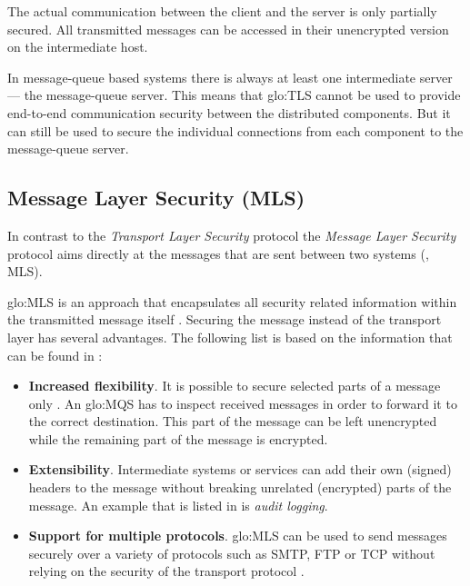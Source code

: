 The  actual  communication between  the  client  and  the server  is  only
partially  secured. All  transmitted  messages can  be  accessed in  their
unencrypted version on the intermediate host.

In message-queue based  systems there is always at  least one intermediate
server --- the message-queue server.  This means that \gls{glo:TLS} cannot
be  used   to  provide  end-to-end  communication   security  between  the
distributed components.  But it can still be used to secure the individual
connections from each component to the message-queue server.

\subsection[Message Layer Security]{Message Layer Security (MLS)}
\label{sec:fundamentals:mls}

In  contrast   to  the   \emph{Transport  Layer  Security}   protocol  the
\emph{Message Layer Security} protocol  aims directly at the messages that
are sent between two systems (\cite{oasis-wss, mls}, MLS).

\gls{glo:MLS}  is  an  approach  that encapsulates  all  security  related
information within the transmitted message itself \cite{mls}. Securing the
message  instead  of the  transport  layer  has  several advantages.   The
following  list  is  based  on  the  information  that  can  be  found  in
\cite{mls}:

\begin{itemize}
\item \textbf{Increased  flexibility}. It  is possible to  secure selected
  parts of  a message  only \cite{mls}.  An  \gls{glo:MQS} has  to inspect
  received   messages   in   order   to   forward  it   to   the   correct
  destination. This part of the  message can be left unencrypted while the
  remaining part of the message is encrypted.
\item  \textbf{Extensibility}.  Intermediate systems  or services  can add
  their  own (signed) headers  to the  message without  breaking unrelated
  (\eg  encrypted) parts  of the  message. An  example that  is  listed in
  \cite{mls} is \emph{audit logging}.
\item \textbf{Support  for multiple protocols}. \gls{glo:MLS}  can be used
  to send messages securely over a  variety of protocols such as SMTP, FTP
  or  TCP  without relying  on  the  security  of the  transport  protocol
  \cite{mls}.
\end{itemize}

